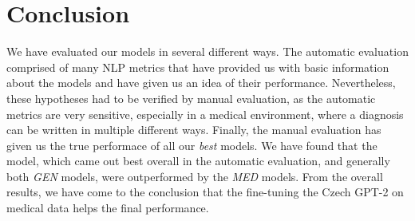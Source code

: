 \section{Conclusion}
We have evaluated our models in several different ways. The automatic evaluation comprised of many NLP metrics that have provided us with basic information about the models and have given us an idea of their performance. Nevertheless, these hypotheses had to be verified by manual evaluation, as the automatic metrics are very sensitive, especially in a medical environment, where a diagnosis can be written in multiple different ways. Finally, the manual evaluation has given us the true performace of all our \textit{best} models. We have found that the model, which came out best overall in the automatic evaluation, and generally both \textit{GEN} models, were outperformed by the \textit{MED} models. From the overall results, we have come to the conclusion that the fine-tuning the Czech GPT-2 on medical data helps the final performance.





